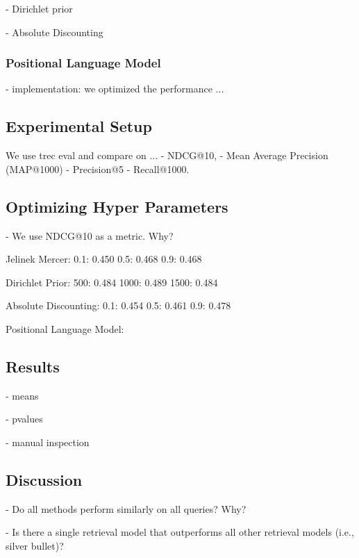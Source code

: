 - Dirichlet prior

- Absolute Discounting

\subsubsection{Positional Language Model}

- implementation: we optimized the performance ...


\subsection{Experimental Setup}



We use trec eval and compare on ...
- NDCG@10, 
- Mean Average Precision (MAP@1000) 
- Precision@5
- Recall@1000.

\subsection{Optimizing Hyper Parameters}

- We use NDCG@10 as a metric. Why?

Jelinek Mercer:
0.1: 0.450
0.5: 0.468
0.9: 0.468

Dirichlet Prior:
500: 0.484
1000: 0.489
1500: 0.484

Absolute Discounting:
0.1: 0.454
0.5: 0.461
0.9: 0.478

Positional Language Model:




\subsection{Results}

- means



- pvalues

- manual inspection

\subsection{Discussion}

- Do all methods perform similarly on all queries? Why?

- Is there a single retrieval model that outperforms all other retrieval models (i.e., silver bullet)?